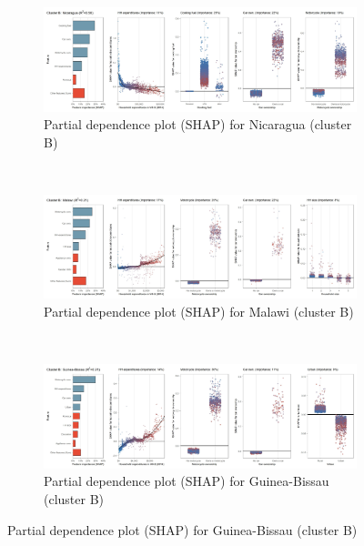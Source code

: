 \begin{figure}[ht!]\ContinuedFloat
    \centering
   \begin{subfigure}[b]{\textwidth}
         \centering
         \caption{Partial dependence plot (SHAP) for Nicaragua (cluster B)}
         \label{fig:5b_NIC}
         \includegraphics[width=\textwidth]{Figure 5b/Figure_5b_NIC}         
     \end{subfigure}
    \\
    \vspace{0.5cm}
   \begin{subfigure}[b]{\textwidth}
         \centering
         \caption{Partial dependence plot (SHAP) for Malawi (cluster B)}
         \label{fig:5b_MWI}
         \includegraphics[width=\textwidth]{Figure 5b/Figure_5b_MWI}         
     \end{subfigure}
    \\
    \vspace{0.5cm}
   \begin{subfigure}[b]{\textwidth}
         \centering
         \caption{Partial dependence plot (SHAP) for Guinea-Bissau (cluster B)}
         \label{fig:5b_GNB}
         \includegraphics[width=\textwidth]{Figure 5b/Figure_5b_GNB}

\end{subfigure}
\end{figure}
